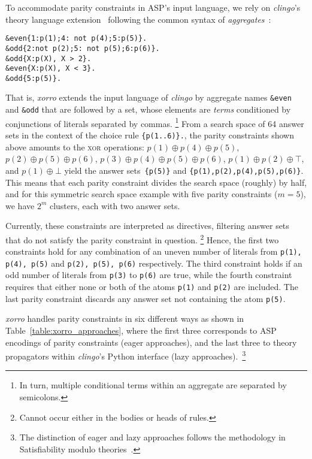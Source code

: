 \documentclass{article}
\newcommand{\XOR}{\textsc{xor}} %
\newcommand{\sysfont}{\textit}
\newcommand{\clingo}{\sysfont{clingo}}
\newcommand{\xorro}{\sysfont{xorro}}
\newcommand{\xor}{\oplus}
\newcommand{\set}[1]{\{#1\}}
\begin{document}
To accommodate parity constraints in ASP's input language,
we rely on \clingo’s theory language extension~\cite{DBLP:conf/iclp/GebserKKOSW16}
following the common syntax of \emph{aggregates}~\cite{DBLP:journals/tplp/GebserHKLS15}:

\begin{verbatim}
&even{1:p(1);4: not p(4);5:p(5)}.
&odd{2:not p(2);5: not p(5);6:p(6)}.
&odd{X:p(X), X > 2}.
&even{X:p(X), X < 3}.
&odd{5:p(5)}.
\end{verbatim}

%
That is, \xorro{} extends the input language of \clingo{} by
aggregate names \texttt{\&even} and \texttt{\&odd} that are followed
by a set, whose elements are \emph{terms} conditioned by
conjunctions of literals separated by commas.%
%
\footnote{In turn, multiple conditional terms within an aggregate are
	separated by semicolons.}
%
From a search space of 64 answer sets in the context of the choice rule \texttt{\set{p(1..6)}.}, the parity constraints shown above
amounts to the \XOR{} operations:
$p(1) \xor p(4) \xor p(5)$, $p(2) \xor p(5) \xor p(6)$, $p(3) \xor p(4) \xor p(5) \xor p(6)$, $p(1) \xor p(2) \xor \top$, and $p(1) \xor \bot$
yield the answer sets~\texttt{\set{p(5)}} and \texttt{\set{p(1),p(2),p(4),p(5),p(6)}}.
This means that each parity constraint divides the search space (roughly) by half, and for this symmetric search space example with five parity constraints ($m=5$),
we have $2^m$ clusters, each with two answer sets.


Currently, these constraints are interpreted as directives,
filtering answer sets that do not satisfy the parity constraint in question.
\footnote{Cannot occur either in the bodies or heads of rules.}
%
Hence, the first two
constraints hold for any combination of an uneven number of literals from \texttt{p(1), p(4), p(5)} and \texttt{p(2), p(5), p(6)} respectively.
The third constraint holds if an odd number of literals from \texttt{p(3)} to \texttt{p(6)} are true, while the fourth constraint requires that either none or both of
the atoms \texttt{p(1)} and \texttt{p(2)} are included.
The last parity constraint discards any answer set not containing the atom \texttt{p(5)}.

\xorro{} handles parity constraints in six different ways as shown in Table~\ref{table:xorro_approaches},
where the first three corresponds to ASP encodings of parity constraints (eager approaches), and the last three to theory propagators within \clingo{}'s Python interface (lazy approaches).~\footnote{The distinction of eager and lazy approaches follows the methodology in Satisfiability modulo theories~\cite{baseseti09a}.}
\end{document}
